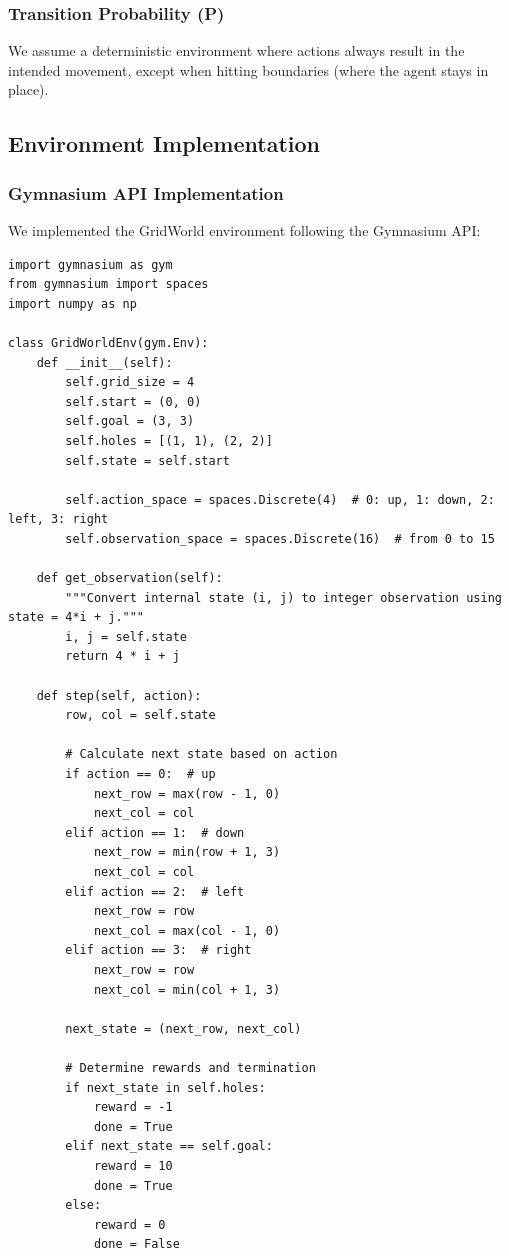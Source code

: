 \documentclass[12pt]{article}
\begin{document}
{{{\subsubsection{Transition Probability (P)}

We assume a deterministic environment where actions always result in the intended movement, except when hitting boundaries (where the agent stays in place).

\subsection{Environment Implementation}

\subsubsection{Gymnasium API Implementation}

We implemented the GridWorld environment following the Gymnasium API:

\begin{verbatim}
import gymnasium as gym
from gymnasium import spaces
import numpy as np

class GridWorldEnv(gym.Env):
    def __init__(self):       
        self.grid_size = 4
        self.start = (0, 0)  
        self.goal = (3, 3)  
        self.holes = [(1, 1), (2, 2)]  
        self.state = self.start
        
        self.action_space = spaces.Discrete(4)  # 0: up, 1: down, 2: left, 3: right
        self.observation_space = spaces.Discrete(16)  # from 0 to 15

    def get_observation(self):
        """Convert internal state (i, j) to integer observation using state = 4*i + j."""
        i, j = self.state
        return 4 * i + j

    def step(self, action):        
        row, col = self.state
        
        # Calculate next state based on action
        if action == 0:  # up
            next_row = max(row - 1, 0)
            next_col = col
        elif action == 1:  # down
            next_row = min(row + 1, 3)
            next_col = col
        elif action == 2:  # left
            next_row = row
            next_col = max(col - 1, 0)
        elif action == 3:  # right
            next_row = row
            next_col = min(col + 1, 3)

        next_state = (next_row, next_col)
        
        # Determine rewards and termination
        if next_state in self.holes:
            reward = -1
            done = True
        elif next_state == self.goal:
            reward = 10
            done = True
        else:
            reward = 0
            done = False
        

\end{verbatim}}}}
\end{document}
